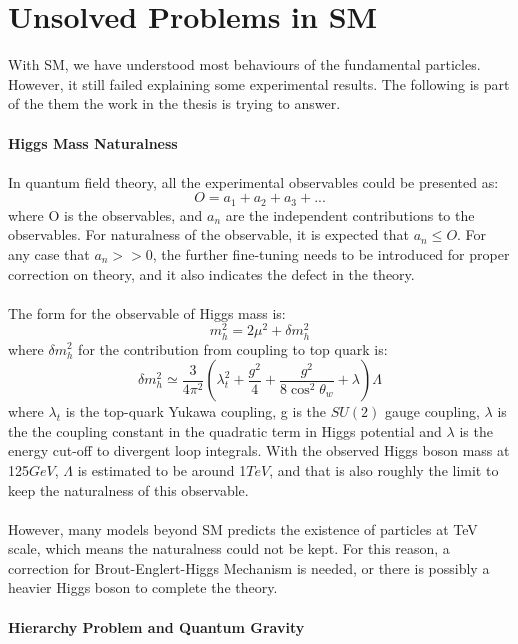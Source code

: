 \section{Unsolved Problems in SM}
With SM, we have understood most behaviours of the fundamental particles. However, it still failed explaining some experimental results. The following is part of the them the work in the thesis is trying to answer.
\\
\\{\bf Higgs Mass Naturalness}
\\
\\In quantum field theory, all the experimental observables could be presented as:
\begin{equation}
O=a_1+a_2+a_3+...
\end{equation}
where O is the observables, and $a_n$ are the independent contributions to the observables. For naturalness of the observable, it is expected that $a_n\leq O$. For any case that $a_n>>0$, the further fine-tuning needs to be introduced for proper correction on theory, and it also indicates the defect in the theory. \\
\\The form for the observable of Higgs mass is:
\begin{equation}
m_h^2=2\mu^2+\delta m_h^2
\end{equation}
where $\delta m_h^2$ for the contribution from coupling to top quark is:
\begin{equation}
\delta m_h^2 \simeq \frac{3}{4\pi^2}\left(\lambda^2_t+\frac{g^2}{4}+\frac{g^2}{8\cos^2{\theta_w}}+\lambda\right)\Lambda
\end{equation}
where $\lambda_t$ is the top-quark Yukawa coupling, g is the $SU\left(2\right)$ gauge coupling, $\lambda$ is the the coupling constant in the quadratic term in Higgs potential and $\lambda$ is the energy cut-off to divergent loop integrals. With the observed Higgs boson mass at 125$GeV$, $\Lambda$ is estimated to be around 1$TeV$, and that is also roughly the limit to keep the naturalness of this observable. 
\\
\\However, many models beyond SM predicts the existence of particles at TeV scale, which means the naturalness could not be kept. For this reason, a correction for Brout-Englert-Higgs Mechanism is needed, or there is possibly a heavier Higgs boson to complete the theory.  
\\
\\{\bf Hierarchy Problem and Quantum Gravity}
